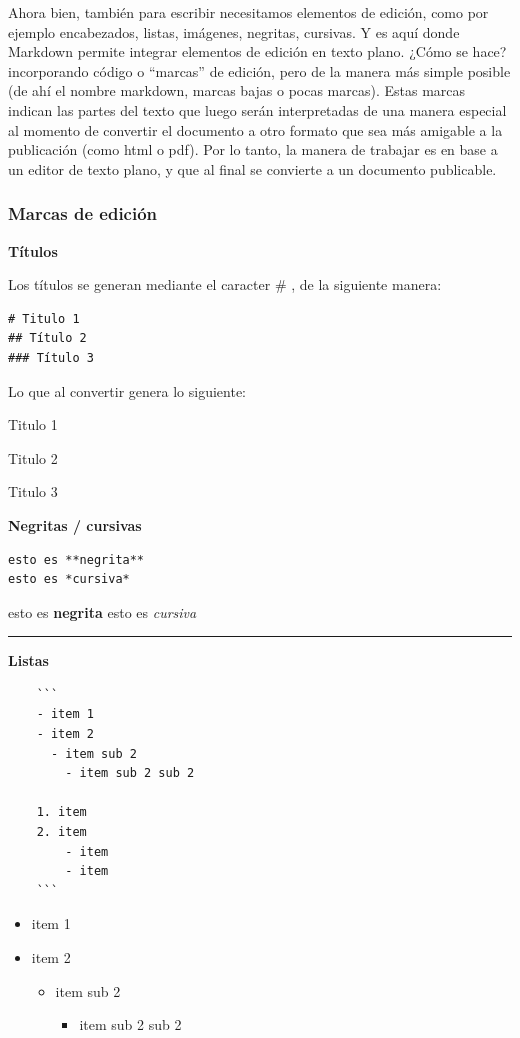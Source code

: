 \documentclass[11pt,]{book}
\providecommand{\tightlist}{%
  \setlength{\itemsep}{0pt}\setlength{\parskip}{0pt}}
\begin{document}
Ahora bien, también para escribir necesitamos elementos de edición, como por ejemplo encabezados, listas, imágenes, negritas, cursivas. Y es aquí donde Markdown permite integrar elementos de edición en texto plano. ¿Cómo se hace? incorporando código o ``marcas'' de edición, pero de la manera más simple posible (de ahí el nombre markdown, marcas bajas o pocas marcas). Estas marcas indican las partes del texto que luego serán interpretadas de una manera especial al momento de convertir el documento a otro formato que sea más amigable a la publicación (como html o pdf). Por lo tanto, la manera de trabajar es en base a un editor de texto plano, y que al final se convierte a un documento publicable.

\hypertarget{marcas-de-ediciuxf3n}{%
\subsubsection{Marcas de edición}\label{marcas-de-ediciuxf3n}}

\textbf{Títulos}

Los títulos se generan mediante el caracter \# , de la siguiente manera:

\begin{verbatim}
# Titulo 1
## Título 2
### Título 3
\end{verbatim}

Lo que al convertir genera lo siguiente:

Titulo 1

Titulo 2

Titulo 3

\textbf{Negritas / cursivas}

\begin{verbatim}
esto es **negrita**
esto es *cursiva*
\end{verbatim}

esto es \textbf{negrita}
esto es \emph{cursiva}

\begin{center}\rule{0.5\linewidth}{\linethickness}\end{center}

\textbf{Listas}

\begin{verbatim}
    ```
    - item 1
    - item 2
      - item sub 2
        - item sub 2 sub 2

    1. item
    2. item
        - item
        - item
    ```
\end{verbatim}

\begin{itemize}
\tightlist
\item
  item 1
\item
  item 2

  \begin{itemize}
  \tightlist
  \item
    item sub 2

    \begin{itemize}
    \tightlist
    \item
      item sub 2 sub 2
    \end{itemize}
  \end{itemize}
\end{itemize}
\end{document}
